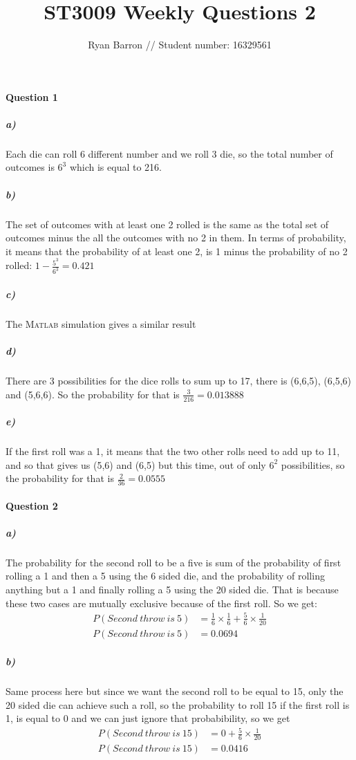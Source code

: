 \documentclass{article}
\title{ST3009 Weekly Questions 2}
\author{Ryan Barron // Student number: 16329561}
\date{}
\begin{document}
\maketitle

\paragraph{Question 1}
\subparagraph{a)}   
Each die can roll 6 different number and we roll 3 die, so the total number of outcomes is $6^3$ which is equal to 216.
\subparagraph{b)}
The set of outcomes with at least one 2 rolled is the same as the total set of outcomes minus the all the outcomes with no 2 in them. In terms of probability, it means that the probability of at least one 2, is 1 minus the probability of no 2 rolled: $1 - \frac{5^3}{6^3}=0.421$
\subparagraph{c)}
The \textsc{Matlab} simulation gives a similar result
\subparagraph{d)}
There are 3 possibilities for the dice rolls to sum up to 17, there is (6,6,5), (6,5,6) and (5,6,6). So the probability for that is $\frac{3}{216} = 0.013888$
\subparagraph{e)}
If the first roll was a 1, it means that the two other rolls need to add up to 11, and so that gives us (5,6) and (6,5) but this time, out of only $6^2$ possibilities, so the probability for that is $\frac{2}{36} = 0.0555$
\paragraph{Question 2}
\subparagraph{a)}
The probability for the second roll to be a five is sum of the probability of first rolling a 1 and then a 5 using the 6 sided die, and the probability of rolling anything but a 1 and finally rolling a 5 using the 20 sided die. That is because these two cases are mutually exclusive because of the first roll. So we get:
\begin{equation*}
\begin{split}
P(Second\: throw\: is\: 5) & = \frac{1}{6}\times\frac{1}{6}+\frac{5}{6}\times\frac{1}{20} \\ 
P(Second\: throw\: is\: 5) & = 0.0694	
\end{split}
\end{equation*}
\subparagraph{b)}
Same process here but since we want the second roll to be equal to 15, only the 20 sided die can achieve such a roll, so the probability to roll 15 if the first roll is 1, is equal to 0 and we can just ignore that probabibility, so we get
\begin{equation*}
\begin{split}
P(Second\: throw\: is\: 15) & = 0 +\frac{5}{6}\times\frac{1}{20} \\ 
P(Second\: throw\: is\: 15) & = 0.0416	
\end{split}
\end{equation*}
\end{document}
